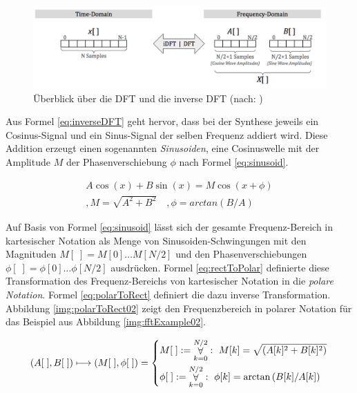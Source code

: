 \begin{figure}[h]
	\centering
	\includegraphics[width=1\textwidth]{bilder/dftOverview04.png}
	\caption{Überblick über die DFT und die inverse DFT (nach: \cite[S. 147]{dspGuide})}
	\label{img:dtOverview}
\end{figure}

Aus Formel \ref{eq:inverseDFT} geht hervor, dass bei der Synthese jeweils ein Cosinus-Signal und ein Sinus-Signal der selben Frequenz addiert wird. Diese Addition erzeugt einen sogenannten \emph{Sinusoiden}, eine Cosinuswelle mit der Amplitude $M$ der Phasenverschiebung $\phi$ nach Formel \ref{eq:sinusoid}.\cite[S. 162]{dspGuide}

\begin{equation}
\begin{split}
A \cos(x) + B \sin(x) = M \cos(x + \phi) \\
,M = \sqrt{A^2 + B^2} \quad, \phi = arctan(B/A)
\end{split}
\label{eq:sinusoid}
\end{equation}

Auf Basis von Formel \ref{eq:sinusoid} lässt sich der gesamte Frequenz-Bereich in kartesischer Notation als Menge von Sinusoiden-Schwingungen mit den Magnituden $M[\;] = M[0] \ldots M[N/2]$ und den Phasenverschiebungen $\phi[\;] = \phi[0] \ldots \phi[N/2]$ ausdrücken. Formel \ref{eq:rectToPolar} definierte diese Transformation des Frequenz-Bereichs von kartesischer Notation in die \emph{polare Notation}. Formel \ref{eq:polarToRect} definiert die dazu inverse Transformation. \cite[S. 162]{dspGuide} Abbildung \ref{img:polarToRect02} zeigt den Frequenzbereich in polarer Notation für das Beispiel aus  Abbildung \ref{img:fftExample02}.

\begin{equation}
(A[\;], B[\;]) \longmapsto (M[\;], \phi[\;])  = 
\begin{dcases}
M[\;] := \mathop{\forall}_{k = 0}^{N/2} :\ M[k] = \sqrt{(A[k]^2 + B[k]^2 ) }   \\
 \phi[\;]  := \mathop{\forall}_{k = 0}^{N/2} :\ \phi[k]= \arctan{(B[k] / A[k]) }
\end{dcases}
\label{eq:rectToPolar}
\end{equation}

